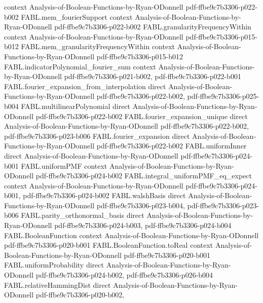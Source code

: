 \begin{theorem}
  {context}
  {Analysis-of-Boolean-Functions-by-Ryan-ODonnell}
  {pdf-ffbe9c7b3306-p022-b002}
\proofstep
  {FABL.mem_fourierSupport}
  {context}
  {Analysis-of-Boolean-Functions-by-Ryan-ODonnell}
  {pdf-ffbe9c7b3306-p022-b002}
\proofstep
  {FABL.granularityFrequencyWithin}
  {context}
  {Analysis-of-Boolean-Functions-by-Ryan-ODonnell}
  {pdf-ffbe9c7b3306-p015-b012}
\proofstep
  {FABL.mem_granularityFrequencyWithin}
  {context}
  {Analysis-of-Boolean-Functions-by-Ryan-ODonnell}
  {pdf-ffbe9c7b3306-p015-b012}
\proofstep
  {FABL.indicatorPolynomial_fourier_sum}
  {context}
  {Analysis-of-Boolean-Functions-by-Ryan-ODonnell}
  {pdf-ffbe9c7b3306-p021-b002,
    pdf-ffbe9c7b3306-p022-b001}
\proofstep
  {FABL.fourier_expansion_from_interpolation}
  {direct}
  {Analysis-of-Boolean-Functions-by-Ryan-ODonnell}
  {pdf-ffbe9c7b3306-p022-b002,
    pdf-ffbe9c7b3306-p025-b004}
\proofstep
  {FABL.multilinearPolynomial}
  {direct}
  {Analysis-of-Boolean-Functions-by-Ryan-ODonnell}
  {pdf-ffbe9c7b3306-p022-b002}
\proofstep
  {FABL.fourier_expansion_unique}
  {direct}
  {Analysis-of-Boolean-Functions-by-Ryan-ODonnell}
  {pdf-ffbe9c7b3306-p022-b002,
    pdf-ffbe9c7b3306-p023-b006}
\proofstep
  {FABL.fourier_expansion}
  {direct}
  {Analysis-of-Boolean-Functions-by-Ryan-ODonnell}
  {pdf-ffbe9c7b3306-p022-b002}
\proofstep
  {FABL.uniformInner}
  {direct}
  {Analysis-of-Boolean-Functions-by-Ryan-ODonnell}
  {pdf-ffbe9c7b3306-p024-b001}
\proofstep
  {FABL.uniformPMF}
  {context}
  {Analysis-of-Boolean-Functions-by-Ryan-ODonnell}
  {pdf-ffbe9c7b3306-p024-b002}
\proofstep
  {FABL.integral_uniformPMF_eq_expect}
  {context}
  {Analysis-of-Boolean-Functions-by-Ryan-ODonnell}
  {pdf-ffbe9c7b3306-p024-b001,
    pdf-ffbe9c7b3306-p024-b002}
\proofstep
  {FABL.walshBasis}
  {direct}
  {Analysis-of-Boolean-Functions-by-Ryan-ODonnell}
  {pdf-ffbe9c7b3306-p023-b004,
    pdf-ffbe9c7b3306-p023-b006}
\proofstep
  {FABL.parity_orthonormal_basis}
  {direct}
  {Analysis-of-Boolean-Functions-by-Ryan-ODonnell}
  {pdf-ffbe9c7b3306-p024-b003,
    pdf-ffbe9c7b3306-p024-b004}
\proofstep
  {FABL.BooleanFunction}
  {context}
  {Analysis-of-Boolean-Functions-by-Ryan-ODonnell}
  {pdf-ffbe9c7b3306-p020-b001}
\proofstep
  {FABL.BooleanFunction.toReal}
  {context}
  {Analysis-of-Boolean-Functions-by-Ryan-ODonnell}
  {pdf-ffbe9c7b3306-p020-b001}
\proofstep
  {FABL.uniformProbability}
  {direct}
  {Analysis-of-Boolean-Functions-by-Ryan-ODonnell}
  {pdf-ffbe9c7b3306-p024-b002,
    pdf-ffbe9c7b3306-p026-b004}
\proofstep
  {FABL.relativeHammingDist}
  {direct}
  {Analysis-of-Boolean-Functions-by-Ryan-ODonnell}
  {pdf-ffbe9c7b3306-p020-b002,
}
\end{theorem}
